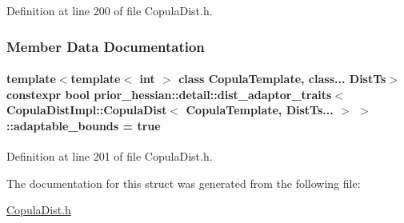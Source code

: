 Definition at line 200 of file Copula\+Dist.\+h.



\subsubsection{Member Data Documentation}
\paragraph[{\texorpdfstring{adaptable\+\_\+bounds}{adaptable_bounds}}]{\setlength{\rightskip}{0pt plus 5cm}template$<$template$<$ int $>$ class Copula\+Template, class... Dist\+Ts$>$ constexpr bool {\bf prior\+\_\+hessian\+::detail\+::dist\+\_\+adaptor\+\_\+traits}$<$ {\bf Copula\+Dist\+Impl\+::\+Copula\+Dist}$<$ Copula\+Template, Dist\+Ts... $>$ $>$\+::adaptable\+\_\+bounds = true\hspace{0.3cm}{\ttfamily [static]}}\hypertarget{structprior__hessian_1_1detail_1_1dist__adaptor__traits_3_01CopulaDistImpl_1_1CopulaDist_3_01Cop7279db6753e87d864b5bda4f78bd9862_a428052cc472c130bde338d279d28a7b2}{}\label{structprior__hessian_1_1detail_1_1dist__adaptor__traits_3_01CopulaDistImpl_1_1CopulaDist_3_01Cop7279db6753e87d864b5bda4f78bd9862_a428052cc472c130bde338d279d28a7b2}


Definition at line 201 of file Copula\+Dist.\+h.



The documentation for this struct was generated from the following file\+:\begin{DoxyCompactItemize}
\item 
\hyperlink{CopulaDist_8h}{Copula\+Dist.\+h}\end{DoxyCompactItemize}
